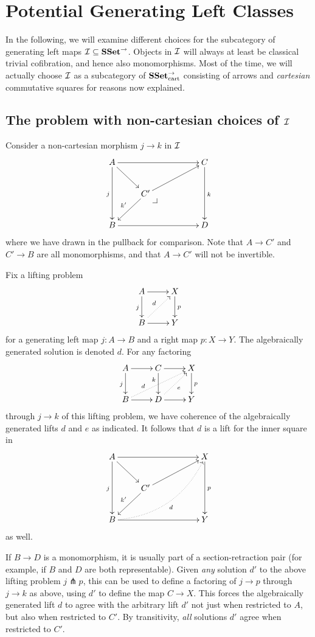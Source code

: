 \documentclass[reqno,10pt,a4paper,oneside]{amsart}
\begin{document}
\section*{Potential Generating Left Classes}

In the following, we will examine different choices for the subcategory of generating left maps $\cal{I} \subseteq \SSet^{\to}$.
Objects in $\cal{I}$ will always at least be classical trivial cofibration, and hence also monomorphisms.
Most of the time, we will actually choose $\cal{I}$ as a subcategory of $\SSet_{\text{cart}}^{\to}$ consisting of arrows and \emph{cartesian} commutative squares for reasons now explained.

\subsection*{The problem with non-cartesian choices of $\cal{I}$}

Consider a non-cartesian morphism $j \to k$ in $\cal{I}$
\[
\xymatrix{
  A
  \ar[rrr]
  \ar[dd]_{j}
  \ar[dr]
&&&
  C
  \ar[dd]^{k}
\\&
  C'
  \ar[urr]
  \ar[dl]_{k'}
  \pullback{dr}
\\
  B
  \ar[rrr]
&&&
  D
}
\]
where we have drawn in the pullback for comparison.
Note that $A \to C'$ and $C' \to B$ are all monomorphisms, and that $A \to C'$ will not be invertible.

Fix a lifting problem
\[
\xymatrix{
  A
  \ar[r]
  \ar[d]_{j}
&
  X
  \ar[d]^{p}
\\
  B
  \ar[r]
  \ar@{.>}[ur]^{d}
&
  Y
}
\]
for a generating left map $j : A \to B$ and a right map $p : X \to Y$.
The algebraically generated solution is denoted $d$.
For any factoring
\[
\xymatrix{
  A
  \ar[r]
  \ar[d]_{j}
&
  C
  \ar[r]
  \ar[d]_(0.35){k}
&
  X
  \ar[d]^{p}
\\
  B
  \ar[r]
  \ar@{.>}[urr]^(0.3){d}
&
  D
  \ar[r]
  \ar@{.>}[ur]_{e}
&
  Y
}
\]
through $j \to k$ of this lifting problem, we have coherence of the algebraically generated lifts $d$ and $e$ as indicated.
It follows that $d$ is a lift for the inner square in
\[
\xymatrix{
  A
  \ar[rrr]
  \ar[dd]_{j}
  \ar[dr]
&&&
  X
  \ar[dd]^{p}
\\&
  C'
  \ar[urr]
  \ar[dl]_{k'}
\\
  B
  \ar[rrr]
  \ar@{.>}@/_2em/[uurrr]_{d}
&&&
  Y
}
\]
as well.

If $B \to D$ is a monomorphism, it is usually part of a section-retraction pair (for example, if $B$ and $D$ are both representable).
Given \emph{any} solution $d'$ to the above lifting problem $j \pitchfork p$, this can be used to define a factoring of $j \to p$ through $j \to k$ as above, using $d'$ to define the map $C \to X$.
This forces the algebraically generated lift $d$ to agree with the arbitrary lift $d'$ not just when restricted to $A$, but also when restricted to $C'$.
By transitivity, \emph{all} solutions $d'$ agree when restricted to $C'$.
\end{document}
